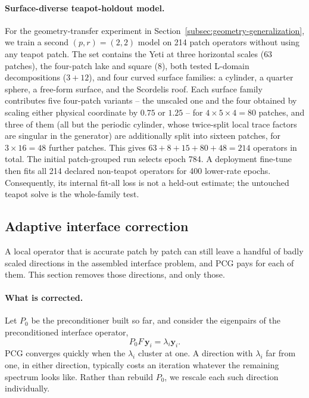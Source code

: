 \documentclass{article}
\newcommand{\vect}[1]{\boldsymbol{#1}}
\newcommand{\Fschur}{F}                           %
\theoremstyle{plain}
\numberwithin{equation}{section}
\begin{document}
\paragraph{Surface-diverse teapot-holdout model.}
For the geometry-transfer experiment in
Section~\ref{subsec:geometry-generalization}, we train a second
$(p,r)=(2,2)$ model on 214 patch operators without using any teapot patch.
The set contains the Yeti at three horizontal scales ($63$ patches), the
four-patch lake and square ($8$), both tested L-domain decompositions
($3+12$), and four curved surface families: a cylinder, a quarter sphere, a
free-form surface, and the Scordelis roof.  Each surface family contributes
five four-patch variants -- the unscaled one and the four obtained by scaling
either physical coordinate by $0.75$ or $1.25$ -- for $4\times5\times4=80$
patches, and three of them (all but the periodic cylinder, whose twice-split
local trace factors are singular in the generator) are additionally split into
sixteen patches, for $3\times16=48$ further patches.  This gives
$63+8+15+80+48=214$ operators in total.
The initial patch-grouped run selects epoch 784.  A deployment fine-tune then
fits all 214 declared non-teapot operators for 400 lower-rate epochs.
Consequently, its internal fit-all loss is not a held-out estimate; the
untouched teapot solve is the whole-family test.

\subsection{Adaptive interface correction}
\label{subsec:mf-ritz}

A local operator that is accurate patch by patch can still leave a handful of
badly scaled directions in the assembled interface problem, and PCG pays for
each of them.  This section removes those directions, and only those.

\paragraph{What is corrected.}
Let $P_0$ be the preconditioner built so far, and consider the eigenpairs of
the preconditioned interface operator,
\begin{equation}
    P_0\Fschur\,\vect y_i=\lambda_i\vect y_i .
    \label{eq:journal-preconditioned-eigenpair}
\end{equation}
PCG converges quickly when the $\lambda_i$ cluster at one.  A direction with
$\lambda_i$ far from one, in either direction, typically costs an iteration
whatever the remaining spectrum looks like.  Rather than rebuild $P_0$, we
rescale each such direction individually.
\end{document}

